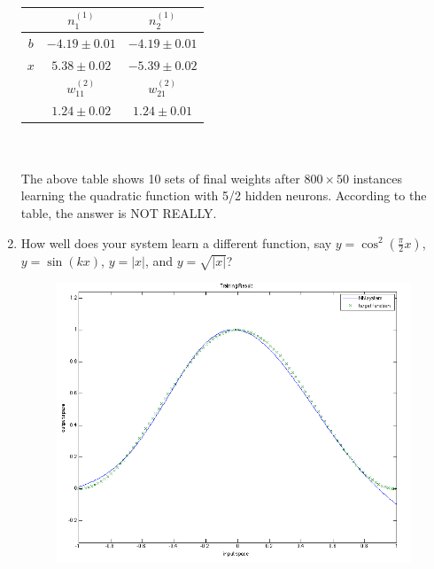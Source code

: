 \documentclass[12pt]{article}
\begin{document}
\begin{enumerate}
\begin{tabular}{|c|c|c|c|c|c|}
				\hline
			\end{tabular}
			\hspace*{0em}
			\begin{tabular}{|c|c|c|}
				\hline
				 & $n^{(1)}_1$ & $n^{(1)}_2$ \\
				\hline
				$b$ & $-4.19 \pm 0.01$ & $-4.19 \pm 0.01$ \\
				\hline
				$x$ & $5.38 \pm 0.02$ & $-5.39 \pm 0.02$ \\
				\hline
				 & $w^{(2)}_{11}$ & $w^{(2)}_{21}$ \\
				\hline
				 & $1.24 \pm 0.02$ & $1.24 \pm 0.01$  \\
				 \hline
			\end{tabular} \\ \\
		The above table shows 10 sets of final weights after $800 \times 50$ instances learning the quadratic function with 5/2 hidden neurons. 
		According  to the table, the answer is NOT REALLY.
	\item How well does your system learn a different function, say $y=\cos^2(\frac{\pi}{2}x)$, $y=\sin(kx)$, $y=|x|$, and $y=\sqrt{|x|}$?
	\begin{figure}[ht]
		\hspace*{-2.9em}
		\includegraphics[scale=.19]{../res/result_cos2_nN5.png}
		\hspace*{-1em}

\end{figure}
\end{enumerate}
\end{document}
